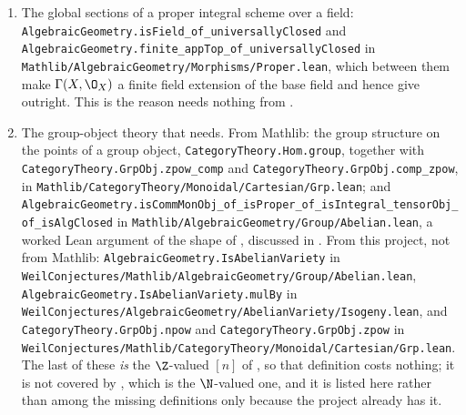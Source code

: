 \begin{enumerate}
  base field, \texttt{AlgebraicGeometry.ext\_of\_isDominant}, the adjunction
  between global sections and $\Spec$, \texttt{Scheme.residueField},
  \texttt{Scheme.fromSpecStalk} in
  \texttt{Mathlib/AlgebraicGeometry/Stalk.lean} --- which gives the morphism
  $Z_n\to Z$ of  --- and
  \texttt{AlgebraicGeometry.IsOpenImmersion.lift} together with
  \texttt{Scheme.Hom.resLE}, which factor a morphism whose set-theoretic
  image lies in an open subset through that open subscheme --- used in Step 1
  of  and in
  .
  \item The global sections of a proper integral scheme over a field:
  \texttt{AlgebraicGeometry.isField\_of\_universallyClosed} and
  \texttt{AlgebraicGeometry.finite\_appTop\_of\_universallyClosed} in
  \texttt{Mathlib/AlgebraicGeometry/Morphisms/Proper.lean}, which between them
  make $\Gamma(X,\O_X)$ a finite field extension of the base field and hence
  give  outright.  This is the reason
   needs nothing from .
  \item The group-object theory that  needs.  From
  Mathlib: the group structure on the points of a group object,
  \texttt{CategoryTheory.Hom.group}, together with
  \texttt{CategoryTheory.GrpObj.zpow\_comp} and
  \texttt{CategoryTheory.GrpObj.comp\_zpow}, in
  \texttt{Mathlib/CategoryTheory/Monoidal/Cartesian/Grp.lean}; and
  \texttt{AlgebraicGeometry.isCommMonObj\_of\_isProper\_of\_isIntegral\_tensorObj\_of\_isAlgClosed}
  in \texttt{Mathlib/AlgebraicGeometry/Group/Abelian.lean}, a worked Lean
  argument of the shape of , discussed in
  .  From this project, not from Mathlib:
  \texttt{AlgebraicGeometry.IsAbelianVariety} in
  \texttt{WeilConjectures/Mathlib/AlgebraicGeometry/Group/Abelian.lean},
  \texttt{AlgebraicGeometry.IsAbelianVariety.mulBy} in
  \texttt{WeilConjectures/AlgebraicGeometry/AbelianVariety/Isogeny.lean}, and
  \texttt{CategoryTheory.GrpObj.npow} and
  \texttt{CategoryTheory.GrpObj.zpow} in
  \texttt{WeilConjectures/Mathlib/CategoryTheory/Monoidal/Cartesian/Grp.lean}.
  The last of these \emph{is} the $\Z$-valued $[n]$ of
  , so that definition costs nothing; it is not
  covered by , which is the $\N$-valued one, and it is
  listed here rather than among the missing definitions only because the
  project already has it.
\end{enumerate}

